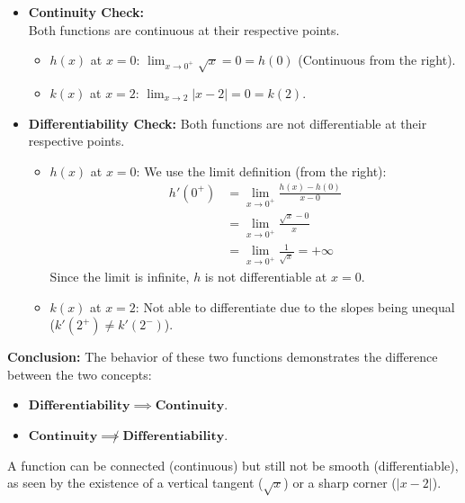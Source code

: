     \begin{itemize}
        \item \textbf{Continuity Check:} \\
        Both functions are continuous at their respective points.
        \begin{itemize}
            \item $h(x)$ at $x=0$: $\lim_{x \to 0^+} \sqrt{x} = 0 = h(0)$ (Continuous from the right).
            \item $k(x)$ at $x=2$: $\lim_{x \to 2} |x - 2| = 0 = k(2)$.
        \end{itemize}
        \item \textbf{Differentiability Check:} Both functions are not differentiable at their respective points.
        \begin{itemize}
            \item $h(x)$ at $x=0$: We use the limit definition (from the right):
             \begin{equation*}
            \begin{split}
            h'(0^+) &= \lim_{x \to 0^+} \frac{h(x) - h(0)}{x - 0} \\
            &= \lim_{x \to 0^+} \frac{\sqrt{x} - 0}{x} \\
            &= \lim_{x \to 0^+} \frac{1}{\sqrt{x}} = \mathbf{+\infty}
            \end{split}
            \end{equation*}
            Since the limit is infinite, $h$ is not differentiable at $x=0$.
            \item $k(x)$ at $x=2$: Not able to differentiate due to the slopes being unequal ($k'(2^+) \ne k'(2^-)$).
        \end{itemize}
    \end{itemize}
    
    \textbf{Conclusion:}
    The behavior of these two functions demonstrates the difference between the two concepts:
    \begin{itemize}
        \item $\mathbf{Differentiability \implies Continuity}$.
        \item $\mathbf{Continuity \not\implies Differentiability}$.
    \end{itemize}
    A function can be connected (continuous) but still not be smooth (differentiable), as seen by the existence of a vertical tangent ($\sqrt{x}$) or a sharp corner ($|x-2|$).
\pagebreak